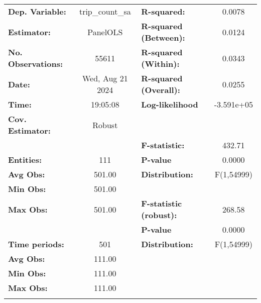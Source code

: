\begin{center}
\begin{tabular}{lclc}
\toprule
\textbf{Dep. Variable:}    &  trip\_count\_sa   & \textbf{  R-squared:         }   &      0.0078      \\
\textbf{Estimator:}        &      PanelOLS      & \textbf{  R-squared (Between):}  &      0.0124      \\
\textbf{No. Observations:} &       55611        & \textbf{  R-squared (Within):}   &      0.0343      \\
\textbf{Date:}             &  Wed, Aug 21 2024  & \textbf{  R-squared (Overall):}  &      0.0255      \\
\textbf{Time:}             &      19:05:08      & \textbf{  Log-likelihood     }   &    -3.591e+05    \\
\textbf{Cov. Estimator:}   &       Robust       & \textbf{                     }   &                  \\
\textbf{}                  &                    & \textbf{  F-statistic:       }   &      432.71      \\
\textbf{Entities:}         &        111         & \textbf{  P-value            }   &      0.0000      \\
\textbf{Avg Obs:}          &       501.00       & \textbf{  Distribution:      }   &    F(1,54999)    \\
\textbf{Min Obs:}          &       501.00       & \textbf{                     }   &                  \\
\textbf{Max Obs:}          &       501.00       & \textbf{  F-statistic (robust):} &      268.58      \\
\textbf{}                  &                    & \textbf{  P-value            }   &      0.0000      \\
\textbf{Time periods:}     &        501         & \textbf{  Distribution:      }   &    F(1,54999)    \\
\textbf{Avg Obs:}          &       111.00       & \textbf{                     }   &                  \\
\textbf{Min Obs:}          &       111.00       & \textbf{                     }   &                  \\
\textbf{Max Obs:}          &       111.00       & \textbf{                     }   &                  \\
\textbf{}                  &                    & \textbf{                     }   &                  \\
\bottomrule

\end{tabular}
\end{center}
